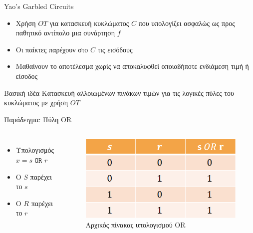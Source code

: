 \documentclass{beamer}
\begin{document}
\begin{frame}{Yao's Garbled Circuits}
	\begin{itemize}
		\item Χρήση $OT$ για κατασκευή κυκλώματος $C$ που υπολογίζει ασφαλώς ως προς παθητικό αντίπαλο μια συνάρτηση $f$
		\item Οι παίκτες παρέχουν στο $C$ τις εισόδους
		\item Mαθαίνουν το αποτέλεσμα χωρίς να αποκαλυφθεί οποιαδήποτε ενδιάμεση τιμή ή είσοδος
	\end{itemize}
	\begin{block}{Βασική ιδέα}
		Κατασκευή αλλοιωμένων πινάκων τιμών για τις λογικές πύλες του κυκλώματος με χρήση $OT$ 
	\end{block}
\end{frame}

\begin{frame}{Παράδειγμα: Πύλη OR}
	\begin{columns}
		\begin{itemize}
			\item Υπολογισμός $x = s$ $\mathtt{OR}$ $r$
			\item O $S$ παρέχει το $s$
			\item O $R$ παρέχει το $r$
		\end{itemize}
		\begin{figure}
			\centering
			\includegraphics[width=\textwidth]{ot_or.png}
			\caption{Αρχικός πίνακας υπολογισμού OR}			 
		\end{figure}
	\end{columns}	
\end{frame}
\end{document}
